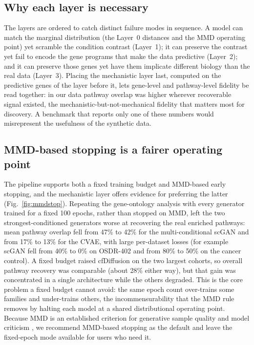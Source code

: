 \documentclass[11pt]{article}
\begin{document}
\subsection{Why each layer is necessary}
The layers are ordered to catch distinct failure modes in sequence. A model can match the marginal distribution (the Layer~0 distances and the MMD operating point) yet scramble the condition contrast (Layer~1); it can preserve the contrast yet fail to encode the gene programs that make the data predictive (Layer~2); and it can preserve those genes yet have them implicate different biology than the real data (Layer~3). Placing the mechanistic layer last, computed on the predictive genes of the layer before it, lets gene-level and pathway-level fidelity be read together: in our data pathway overlap was higher wherever recoverable signal existed, the mechanistic-but-not-mechanical fidelity that matters most for discovery. A benchmark that reports only one of these numbers would misrepresent the usefulness of the synthetic data.

\subsection{MMD-based stopping is a fairer operating point}
The pipeline supports both a fixed training budget and MMD-based early stopping, and the mechanistic layer offers evidence for preferring the latter (Fig.~\ref{fig:mmdstop}). Repeating the gene-ontology analysis with every generator trained for a fixed 100 epochs, rather than stopped on MMD, left the two strongest-conditioned generators worse at recovering the real enriched pathways: mean pathway overlap fell from 47\% to 42\% for the multi-conditional scGAN and from 17\% to 13\% for the CVAE, with large per-dataset losses (for example scGAN fell from 40\% to 0\% on OSDR-402 and from 80\% to 50\% on the cancer control). A fixed budget raised cfDiffusion on the two largest cohorts, so overall pathway recovery was comparable (about 28\% either way), but that gain was concentrated in a single architecture while the others degraded. This is the core problem a fixed budget cannot avoid: the same epoch count over-trains some families and under-trains others, the incommensurability that the MMD rule removes by halting each model at a shared distributional operating point. Because MMD is an established criterion for generative sample quality and model criticism \cite{gretton,sutherland}, we recommend MMD-based stopping as the default and leave the fixed-epoch mode available for users who need it.
\end{document}
